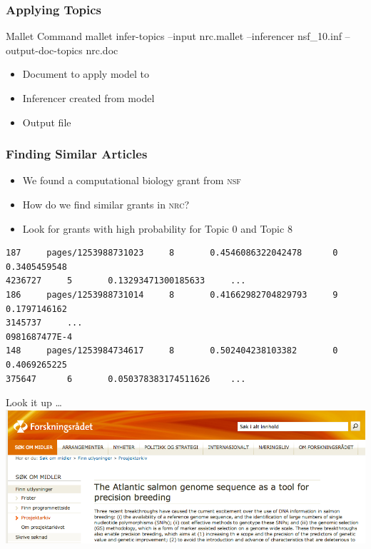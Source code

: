 \begin{frame}
  \frametitle{Applying Topics}
    \begin{block}{Mallet Command}
      mallet infer-topics --input \alert<2>{nrc.mallet} --inferencer \alert<3>{nsf\_10.inf} --output-doc-topics \alert<4>{nrc.doc}
    \end{block}

    \begin{itemize}
      \item Document to apply model to
      \item Inferencer created from model
      \item Output file
    \end{itemize}

\end{frame}


\begin{frame}[fragile]

\frametitle{Finding Similar Articles}

  \begin{itemize}
    \item We found a computational biology grant from \textsc{nsf}
    \item How do we find similar grants in \textsc{nrc}?
    \item Look for grants with high probability for Topic 0 and Topic 8
  \end{itemize}

      \begin{lstlisting}
187     pages/1253988731023     8       0.4546086322042478      0       0.3405459548
4236727     5       0.13293471300185633     ...
186     pages/1253988731014     8       0.41662982704829793     9       0.1797146162
3145737     ...
0981687477E-4   
148     pages/1253984734617     8       0.502404238103382       0       0.4069265225
375647      6       0.050378383174511626    ...
      \end{lstlisting}

      \pause
      \vspace{-3cm}

      \begin{block}{Look it up \dots}
        \centering
        \includegraphics[width=0.8\linewidth]{topic_models/nrc_lookup}
      \end{block}

\end{frame}

